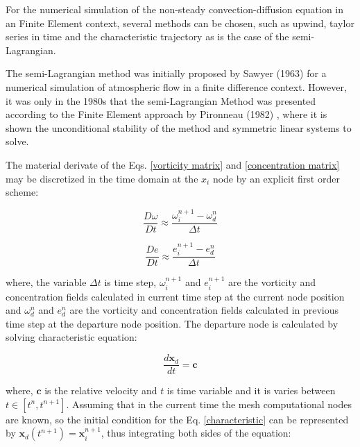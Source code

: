 For the numerical simulation of the 
non-steady convection-diffusion equation 
in an Finite Element context, several methods can be chosen, 
such as upwind, taylor series in time and 
the characteristic trajectory as is the case of the semi-Lagrangian.

\medskip
The semi-Lagrangian method was initially proposed by 
Sawyer (1963) \cite{sawyer1963} for a numerical simulation 
of atmospheric flow in a finite difference context. 
However, it was only in the 1980s that the 
semi-Lagrangian Method was presented according to 
the Finite Element approach by 
Pironneau (1982) \cite{pironneau1982},
where it is shown the unconditional stability of the method and 
symmetric linear systems to solve. 

\medskip
The material derivate of the Eqs. \ref{vorticity matrix} and \ref{concentration matrix} may be discretized in the time
domain at the $x_{i}$ node by an explicit first order scheme:



\vspace{-0.4cm}
\begin{equation}
 \frac{D \omega}{D t} \approx 
 \frac{\omega_{i}^{n+1} - \omega_{d}^{n}}{\Delta t}
\end{equation}

\vspace{-0.8cm}
\begin{equation}
 \frac{D e}{D t} \approx
 \frac{e_{i}^{n+1} - e_{d}^{n}}{\Delta t}
\end{equation}


\medskip
\noindent
where, 
the variable $\Delta t$ is time step, 
$\omega_{i}^{n+1}$ and $e_{i}^{n+1}$ are the vorticity and 
concentration fields calculated in current time step at the current 
node position and
$\omega_{d}^{n}$ and $e_{d}^{n}$ are the vorticity and 
concentration fields calculated in previous time step 
at the departure node position.
The departure node is calculated by solving characteristic equation:

\begin{equation} \label{characteristic}
\frac{d\textbf{x}_{d}}{dt} = \textbf{c}
\end{equation}

\medskip
\noindent
where,
$\textbf{c}$ is the relative velocity and
$t$ is time variable and 
it is varies between $t \in \left[t^{n},t^{n+1}\right]$.
Assuming that in the current time the mesh computational nodes
are known, so the initial condition for the Eq. \ref{characteristic}
can be represented by $\textbf{x}_{d}(t^{n+1}) = \textbf{x}_{i}^{n+1}$,
thus integrating both sides of the equation:

